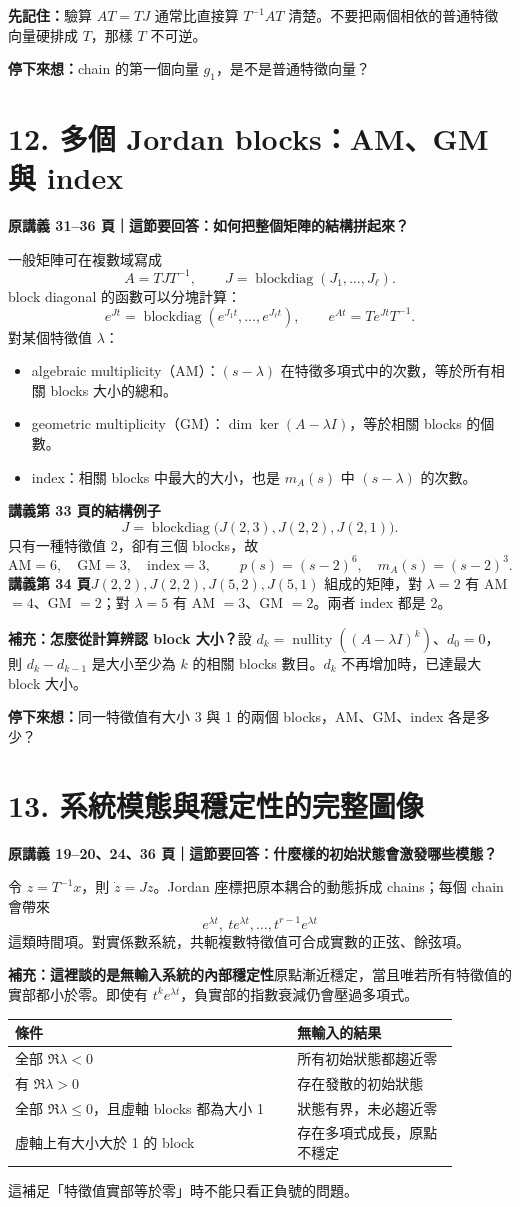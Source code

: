 \documentclass[12pt,a4paper]{article}
\newcommand{\topic}[3]{\clearpage\section*{#1}\textcolor{accent}{\textbf{原講義 #2 頁｜這節要回答：#3}}\par}
\newcommand{\key}[1]{\par\textcolor{accent}{\textbf{先記住：}}#1\par}
\newcommand{\checkq}[1]{\par\textbf{停下來想：}#1\par}
\DeclareMathOperator{\nul}{nullity}
\begin{document}
\key{驗算 $AT=TJ$ 通常比直接算 $T^{-1}AT$ 清楚。不要把兩個相依的普通特徵向量硬排成 $T$，那樣 $T$ 不可逆。}
\checkq{chain 的第一個向量 $g_1$，是不是普通特徵向量？}

\topic{12. 多個 Jordan blocks：AM、GM 與 index}{31--36}{如何把整個矩陣的結構拼起來？}
一般矩陣可在複數域寫成
\[
 A=TJT^{-1},\qquad J=\operatorname{blockdiag}(J_1,\ldots,J_\ell).
\]
block diagonal 的函數可以分塊計算：
\[
 e^{Jt}=\operatorname{blockdiag}(e^{J_1t},\ldots,e^{J_\ell t}),\qquad
 e^{At}=Te^{Jt}T^{-1}.
\]
對某個特徵值 $\lambda$：
\begin{itemize}
\item algebraic multiplicity（AM）：$(s-\lambda)$ 在特徵多項式中的次數，等於所有相關 blocks 大小的總和。
\item geometric multiplicity（GM）：$\dim\ker(A-\lambda I)$，等於相關 blocks 的個數。
\item index：相關 blocks 中最大的大小，也是 $m_A(s)$ 中 $(s-\lambda)$ 的次數。
\end{itemize}
\textbf{講義第 33 頁的結構例子}
\[
 J=\operatorname{blockdiag}\bigl(J(2,3),J(2,2),J(2,1)\bigr).
\]
只有一種特徵值 $2$，卻有三個 blocks，故
\[
 \mathrm{AM}=6,\quad\mathrm{GM}=3,\quad\mathrm{index}=3,
 \qquad p(s)=(s-2)^6,\quad m_A(s)=(s-2)^3.
\]
\textbf{講義第 34 頁}\quad $J(2,2),J(2,2),J(5,2),J(5,1)$ 組成的矩陣，對 $\lambda=2$ 有 AM $=4$、GM $=2$；對 $\lambda=5$ 有 AM $=3$、GM $=2$。兩者 index 都是 2。

\textbf{補充：怎麼從計算辨認 block 大小？}\quad 設 $d_k=\nul((A-\lambda I)^k)$、$d_0=0$，則 $d_k-d_{k-1}$ 是大小至少為 $k$ 的相關 blocks 數目。$d_k$ 不再增加時，已達最大 block 大小。
\checkq{同一特徵值有大小 3 與 1 的兩個 blocks，AM、GM、index 各是多少？}

\topic{13. 系統模態與穩定性的完整圖像}{19--20、24、36}{什麼樣的初始狀態會激發哪些模態？}
令 $z=T^{-1}x$，則 $\dot z=Jz$。Jordan 座標把原本耦合的動態拆成 chains；每個 chain 會帶來
\[
 e^{\lambda t},\ te^{\lambda t},\ldots,t^{r-1}e^{\lambda t}
\]
這類時間項。對實係數系統，共軛複數特徵值可合成實數的正弦、餘弦項。

\textbf{補充：這裡談的是無輸入系統的內部穩定性}\quad 原點漸近穩定，當且唯若所有特徵值的實部都小於零。即使有 $t^ke^{\lambda t}$，負實部的指數衰減仍會壓過多項式。
\begin{center}\small
\begin{tabular}{p{0.56\linewidth}p{0.32\linewidth}}
\toprule 條件 & 無輸入的結果\\\midrule
全部 $\Re\lambda<0$ & 所有初始狀態都趨近零\\
有 $\Re\lambda>0$ & 存在發散的初始狀態\\
全部 $\Re\lambda\le0$，且虛軸 blocks 都為大小 1 & 狀態有界，未必趨近零\\
虛軸上有大小大於 1 的 block & 存在多項式成長，原點不穩定\\\bottomrule
\end{tabular}
\end{center}
這補足「特徵值實部等於零」時不能只看正負號的問題。
\end{document}
